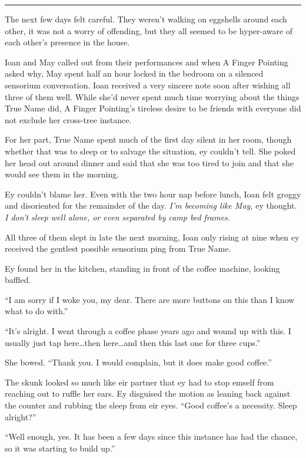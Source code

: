 \vspace{-0.4cm}
\begin{center}\rule{0.5\linewidth}{0.5pt}\end{center}

The next few days felt careful. They weren't walking on eggshells around each other, it was not a worry of offending, but they all seemed to be hyper-aware of each other's presence in the house.

Ioan and May called out from their performances and when A Finger Pointing asked why, May spent half an hour locked in the bedroom on a silenced sensorium conversation. Ioan received a very sincere note soon after wishing all three of them well. While she'd never spent much time worrying about the things True Name did, A Finger Pointing's tireless desire to be friends with everyone did not exclude her cross-tree instance.

For her part, True Name spent much of the first day silent in her room, though whether that was to sleep or to salvage the situation, ey couldn't tell. She poked her head out around dinner and said that she was too tired to join and that she would see them in the morning.

Ey couldn't blame her. Even with the two hour nap before lunch, Ioan felt groggy and disoriented for the remainder of the day. \emph{I'm becoming like May,} ey thought. \emph{I don't sleep well alone, or even separated by camp bed frames.}

All three of them slept in late the next morning, Ioan only rising at nine when ey received the gentlest possible sensorium ping from True Name.

Ey found her in the kitchen, standing in front of the coffee machine, looking baffled.

``I am sorry if I woke you, my dear. There are more buttons on this than I know what to do with.''

``It's alright. I went through a coffee phase years ago and wound up with this. I usually just tap here\ldots then here\ldots and then this last one for three cups.''

She bowed. ``Thank you. I would complain, but it does make good coffee.''

The skunk looked so much like eir partner that ey had to stop emself from reaching out to ruffle her ears. Ey disguised the motion as leaning back against the counter and rubbing the sleep from eir eyes. ``Good coffee's a necessity. Sleep alright?''

``Well enough, yes. It has been a few days since this instance has had the chance, so it was starting to build up.''

